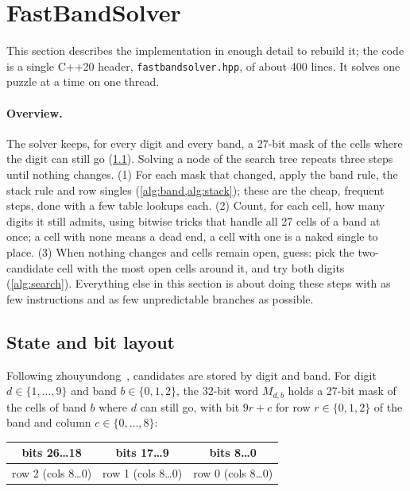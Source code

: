 \documentclass[11pt]{article}
\theoremstyle{definition}
\theoremstyle{plain}
\begin{document}
\section{FastBandSolver}
\label{sec:solver}

This section describes the implementation in enough detail to rebuild it; the code is a single C++20 header,
\texttt{fastbandsolver.hpp}, of about 400 lines. It solves one puzzle at a time on one thread.

\paragraph{Overview.} The solver keeps, for every digit and every band, a 27-bit mask of the cells where the digit can
still go (\cref{sec:state}). Solving a node of the search tree repeats three steps until nothing changes. (1) For each
mask that changed, apply the band rule, the stack rule and row singles (\cref{alg:band,alg:stack}); these are the
cheap, frequent steps, done with a few table lookups each. (2) Count, for each cell, how many digits it still admits,
using bitwise tricks that handle all 27 cells of a band at once; a cell with none means a dead end, a cell with one is
a naked single to place. (3) When nothing changes and cells remain open, guess: pick the two-candidate cell with the
most open cells around it, and try both digits (\cref{alg:search}). Everything else in this section is about doing
these steps with as few instructions and as few unpredictable branches as possible.

\subsection{State and bit layout}
\label{sec:state}

Following zhouyundong~\cite{zhouyundong2012solver}, candidates are stored by digit and band. For digit
$d\in\{1,\dots,9\}$ and band $b\in\{0,1,2\}$, the 32-bit word $M_{d,b}$ holds a 27-bit mask of the cells of band $b$
where $d$ can still go, with bit $9r+c$ for row $r\in\{0,1,2\}$ of the band and column $c\in\{0,\dots,8\}$:

\begin{center}
\small
\begin{tabular}{ccc}
bits 26\ldots18 & bits 17\ldots9 & bits 8\ldots0 \\
\midrule
row 2 (cols 8\ldots0) & row 1 (cols 8\ldots0) & row 0 (cols 8\ldots0) \\
\end{tabular}
\end{center}
\end{document}
